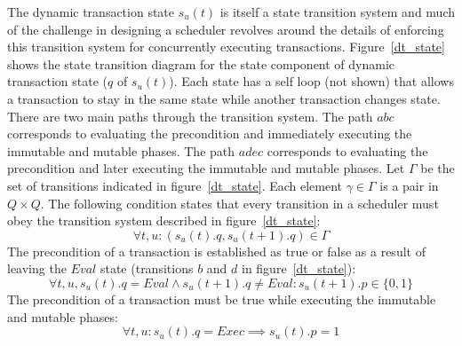 The dynamic transaction state $s_u(t)$ is itself a state transition system and much of the challenge in designing a scheduler revolves around the details of enforcing this transition system for concurrently executing transactions.
Figure~\ref{dt_state} shows the state transition diagram for the state component of dynamic transaction state ($q$ of $s_u(t)$).
Each state has a self loop (not shown) that allows a transaction to stay in the same state while another transaction changes state.
There are two main paths through the transition system.
The path $abc$ corresponds to evaluating the precondition and immediately executing the immutable and mutable phases.
The path $adec$ corresponds to evaluating the precondition and later executing the immutable and mutable phases.
Let $\Gamma$ be the set of transitions indicated in figure~\ref{dt_state}.
Each element $\gamma \in \Gamma$ is a pair in $Q \times Q$.
The following condition states that every transition in a scheduler must obey the transition system described in figure~\ref{dt_state}:
\begin{equation}
  \forall t, u : (s_u(t).q, s_u(t+1).q) \in \Gamma
\end{equation}
The precondition of a transaction is established as true or false as a result of leaving the $\mathit{Eval}$ state (transitions $b$ and $d$ in figure~\ref{dt_state}):
\begin{equation}
  \label{pre_establish}
  \forall t, u, s_u(t).q = \mathit{Eval} \land s_u(t+1).q \neq \mathit{Eval} : s_u(t+1).p \in \{0,1\}
\end{equation}
The precondition of a transaction must be true while executing the immutable and mutable phases:
\begin{equation}
  \label{pre_true}
  \forall t, u : s_u(t).q = \mathit{Exec} \implies s_u(t).p = 1
\end{equation}

